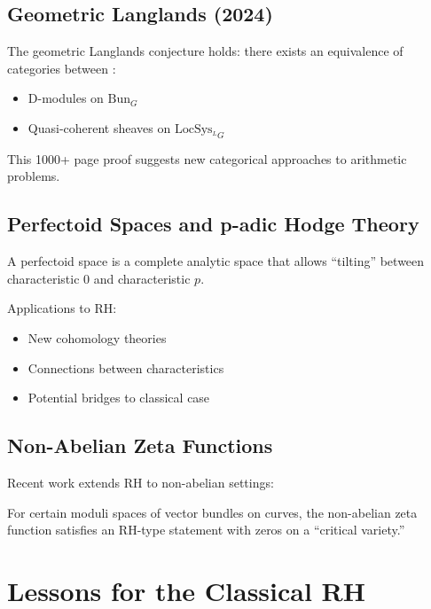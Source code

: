 \subsection{Geometric Langlands (2024)}

\begin{theorem}
The geometric Langlands conjecture holds: there exists an equivalence of categories between \cite{langlands1976}:
\begin{itemize}
\item D-modules on $\text{Bun}_G$
\item Quasi-coherent sheaves on $\text{LocSys}_{{}^L G}$
\end{itemize}
\end{theorem}

This 1000+ page proof suggests new categorical approaches to arithmetic problems.

\subsection{Perfectoid Spaces and p-adic Hodge Theory}

\begin{definition}[Scholze]
A perfectoid space is a complete analytic space that allows ``tilting'' between characteristic 0 and characteristic $p$.
\end{definition}

Applications to RH:
\begin{itemize}
\item New cohomology theories
\item Connections between characteristics
\item Potential bridges to classical case
\end{itemize}

\subsection{Non-Abelian Zeta Functions}

Recent work extends RH to non-abelian settings:

\begin{theorem}[2022]
For certain moduli spaces of vector bundles on curves, the non-abelian zeta function satisfies an RH-type statement with zeros on a ``critical variety.''
\end{theorem}

\section{Lessons for the Classical RH}
\label{sec:lessons}

